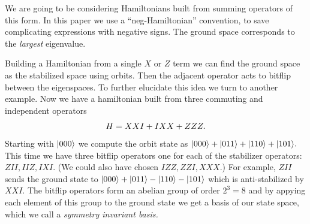 \documentclass[12pt]{article}
\begin{document}
We are going to be considering Hamiltonians built from
summing operators of this form.
In this paper we use a ``neg-Hamiltonian'' convention,
to save complicating expressions with negative signs.
The ground space corresponds to the \emph{largest} eigenvalue.

Building a Hamiltonian from a single $X$ or $Z$ term
we can find the ground space as the stabilized space
using orbits. Then the adjacent operator acts to bitflip
between the eigenspaces.
To further elucidate this idea we turn to another example.
Now we have a hamiltonian built from three commuting and
independent operators 
$$
    H = XXI + IXX + ZZZ.
$$
Starting with $|{000}\rangle$ we compute the orbit state
as $|{000}\rangle+|{011}\rangle+|{110}\rangle+|{101}\rangle.$
This time we have three bitflip operators
one for each of the stabilizer operators:
$ZII, IIZ, IXI.$
(We could also have chosen $IZZ, ZZI, XXX.$)
For example, $ZII$ sends the ground state to
$|{000}\rangle+|{011}\rangle-|{110}\rangle-|{101}\rangle$
which is anti-stabilized by $XXI.$
The bitflip operators form an abelian group of
order $2^3 = 8$ and by appying each element of
this group to the ground state we get a basis
of our state space, which we call a \emph{symmetry
invariant basis.}
\end{document}
